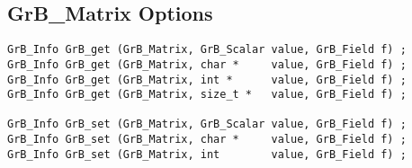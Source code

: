 \newpage
\subsection{{\sf GrB\_Matrix} Options}
\label{get_set_matrix}

\begin{mdframed}[userdefinedwidth=6in]
{\footnotesize
\begin{verbatim}
GrB_Info GrB_get (GrB_Matrix, GrB_Scalar value, GrB_Field f) ;
GrB_Info GrB_get (GrB_Matrix, char *     value, GrB_Field f) ;
GrB_Info GrB_get (GrB_Matrix, int *      value, GrB_Field f) ;
GrB_Info GrB_get (GrB_Matrix, size_t *   value, GrB_Field f) ;

GrB_Info GrB_set (GrB_Matrix, GrB_Scalar value, GrB_Field f) ;
GrB_Info GrB_set (GrB_Matrix, char *     value, GrB_Field f) ;
GrB_Info GrB_set (GrB_Matrix, int        value, GrB_Field f) ;
\end{verbatim}
}\end{mdframed}

